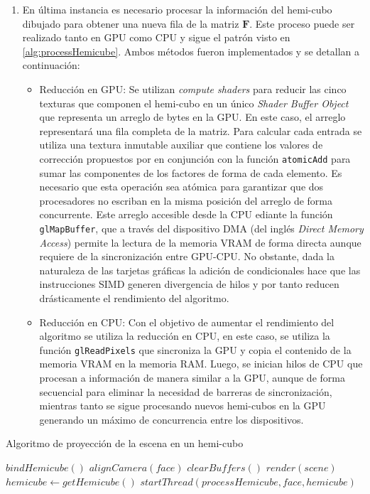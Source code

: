 \begin{enumerate}
\begin{enumerate}
	\end{enumerate}
	\item En última instancia es necesario procesar la información del hemi-cubo dibujado para obtener una nueva fila de la matriz $\mathbf{F}$. Este proceso puede ser realizado tanto en GPU como CPU y sigue el patrón visto en \ref{alg:processHemicube}. Ambos métodos fueron implementados y se detallan a continuación:
	\begin{itemize}
		\item Reducción en GPU: Se utilizan \textit{compute shaders} para reducir las cinco texturas que componen el hemi-cubo en un único \textit{Shader Buffer Object} que representa un arreglo de bytes en la GPU. En este caso, el arreglo representará una fila completa de la matriz. Para calcular cada entrada se utiliza una textura inmutable auxiliar que contiene los valores de corrección propuestos por \citeauthor{Cohen} en conjunción con la función \verb|atomicAdd| para sumar las componentes de los factores de forma de cada elemento. Es necesario que esta operación sea atómica para garantizar que dos procesadores no escriban en la misma posición del arreglo de forma concurrente.
		Este arreglo accesible desde la CPU ediante la función \verb|glMapBuffer|, que a través del dispositivo DMA (del inglés \textit{Direct Memory Access}) permite la lectura de la memoria VRAM de forma directa aunque requiere de la sincronización entre GPU-CPU.
		No obstante, dada la naturaleza de las tarjetas gráficas la adición de condicionales hace que las instrucciones SIMD generen divergencia de hilos y por tanto reducen drásticamente el rendimiento del algoritmo.
		\item Reducción en CPU: Con el objetivo de aumentar el rendimiento del algoritmo se utiliza la reducción en CPU, en este caso, se utiliza la función \verb|glReadPixels| que sincroniza la GPU y copia el contenido de la memoria VRAM en la memoria RAM. Luego, se inician hilos de CPU que procesan a información de manera similar a la GPU, aunque de forma secuencial para eliminar la necesidad de barreras de sincronización,  mientras tanto se sigue procesando nuevos hemi-cubos en la GPU generando un máximo de concurrencia entre los dispositivos.
	\end{itemize}
 \end{enumerate}

\begin{algorithm}
	\caption{Algoritmo de proyección de la escena en un hemi-cubo}
	\label{alg:renderHemicube}	
	\begin{algorithmic}
		\State $bindHemicube()$
		\State $alignCamera(face)$
		\State $clearBuffers()$
		\State $render(scene)$
		\State $hemicube \gets getHemicube()$
		\State $startThread(processHemicube, face, hemicube)$
		\EndLoop
		\EndFunction
	\end{algorithmic}
\end{algorithm}

